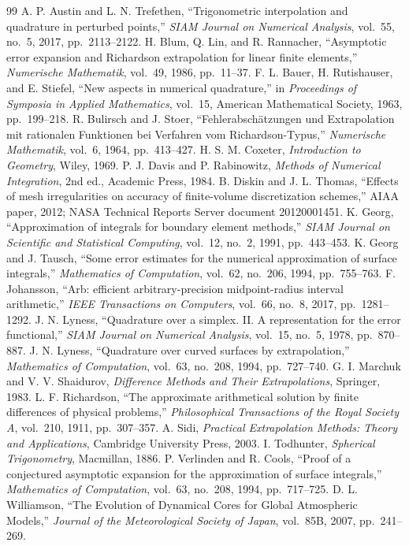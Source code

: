 \documentclass[11pt]{article}
\theoremstyle{remark}
\begin{document}
\begin{thebibliography}{99}
 A. P. Austin and L. N. Trefethen, ``Trigonometric interpolation and
quadrature in perturbed points,'' \emph{SIAM Journal on Numerical Analysis}, vol.~55, no.~5,
2017, pp.~2113--2122.
 H. Blum, Q. Lin, and R. Rannacher, ``Asymptotic error expansion and
Richardson extrapolation for linear finite elements,'' \emph{Numerische Mathematik}, vol.~49,
1986, pp.~11--37.
 F. L. Bauer, H. Rutishauser, and E. Stiefel, ``New aspects in numerical
quadrature,'' in \emph{Proceedings of Symposia in Applied Mathematics}, vol.~15, American
Mathematical Society, 1963, pp.~199--218.
 R. Bulirsch and J. Stoer, ``Fehlerabsch\"atzungen und Extrapolation
mit rationalen Funktionen bei Verfahren vom Richardson-Typus,'' \emph{Numerische Mathematik},
vol.~6, 1964, pp.~413--427.
 H. S. M. Coxeter, \emph{Introduction to Geometry}, Wiley, 1969.
 P. J. Davis and P. Rabinowitz, \emph{Methods of Numerical
Integration}, 2nd ed., Academic Press, 1984.
 B. Diskin and J. L. Thomas, ``Effects of mesh irregularities on accuracy
of finite-volume discretization schemes,'' AIAA paper, 2012; NASA Technical Reports Server
document 20120001451.
 K. Georg, ``Approximation of integrals for boundary element methods,''
\emph{SIAM Journal on Scientific and Statistical Computing}, vol.~12, no.~2, 1991,
pp.~443--453.
 K. Georg and J. Tausch, ``Some error estimates for the numerical
approximation of surface integrals,'' \emph{Mathematics of Computation}, vol.~62, no.~206,
1994, pp.~755--763.
 F. Johansson, ``Arb: efficient arbitrary-precision midpoint-radius interval
arithmetic,'' \emph{IEEE Transactions on Computers}, vol.~66, no.~8, 2017, pp.~1281--1292.
 J. N. Lyness, ``Quadrature over a simplex. II. A representation for the
error functional,'' \emph{SIAM Journal on Numerical Analysis}, vol.~15, no.~5, 1978,
pp.~870--887.
 J. N. Lyness, ``Quadrature over curved surfaces by extrapolation,''
\emph{Mathematics of Computation}, vol.~63, no.~208, 1994, pp.~727--740.
 G. I. Marchuk and V. V. Shaidurov, \emph{Difference Methods and
Their Extrapolations}, Springer, 1983.
 L. F. Richardson, ``The approximate arithmetical solution by finite
differences of physical problems,'' \emph{Philosophical Transactions of the Royal Society A},
vol.~210, 1911, pp.~307--357.
 A. Sidi, \emph{Practical Extrapolation Methods: Theory and Applications},
Cambridge University Press, 2003.
 I. Todhunter, \emph{Spherical Trigonometry}, Macmillan, 1886.
 P. Verlinden and R. Cools, ``Proof of a conjectured asymptotic
expansion for the approximation of surface integrals,'' \emph{Mathematics of Computation},
vol.~63, no.~208, 1994, pp.~717--725.
 D. L. Williamson, ``The Evolution of Dynamical Cores for Global
Atmospheric Models,'' \emph{Journal of the Meteorological Society of Japan}, vol.~85B, 2007,
pp.~241--269.
\end{thebibliography}
\end{document}
